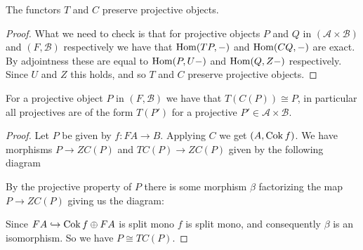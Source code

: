 \begin{cor}
	The functors $T$ and $C$ preserve projective objects.
	\begin{proof}
		What we need to check is that for projective objects $P$ and $Q$ in $(\mathcal A \times \mathcal B)$ and $(F, \mathcal B)$ respectively we have that $\operatorname{Hom}(TP, -)$ and $\operatorname{Hom}(CQ, -)$ are exact. By adjointness these are equal to $\operatorname{Hom}(P, U-)$ and $\operatorname{Hom}(Q, Z-)$ respectively. Since $U$ and $Z$ this holds, and so $T$ and $C$ preserve projective objects.
	\end{proof}
\end{cor}

\begin{prop}\cite[Corollary~1.6c]{FGR75}
	For a projective object $P$ in $(F, \mathcal B)$ we have that $T(C(P)) \cong P$, in particular all projectives are of the form $T(P')$ for a projective $P' \in \mathcal A \times \mathcal B$.
	\begin{proof}
		Let $P$ be given by $f:FA \to B$. Applying $C$ we get $(A, \operatorname{Cok} f)$. We have morphisms $P \to ZC(P)$ and $TC(P) \to ZC(P)$ given by the following diagram
		\begin{center}
		\end{center}
		By the projective property of $P$ there is some morphism $\beta$ factorizing the map $P \to ZC(P)$ giving us the diagram:
		\begin{center}
		\end{center}
		Since $FA \hookrightarrow \operatorname{Cok} f \oplus FA$ is split mono $f$ is split mono, and consequently $\beta$ is an isomorphism. So we have $P \cong TC(P)$.
	\end{proof}
\end{prop}

